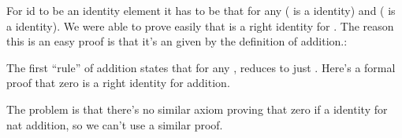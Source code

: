 \documentclass[letterpaper,10pt,english]{sphinxmanual}
\begin{document}
\sphinxAtStartPar
For id to be an identity element it has to be that for
any  ( is a  identity)
and  ( is a  identity). We were
able to prove easily that  is a right identity for
. The reason this is an easy proof is that it’s
an  given by the definition of addition.:

\begin{sphinxVerbatim}[commandchars=\\\{\}]
       
           
           
\end{sphinxVerbatim}

\sphinxAtStartPar
The first “rule” of addition states that for any ,
 reduces to just .  Here’s a formal proof
that zero is a right identity for addition.

\begin{sphinxVerbatim}[commandchars=\\\{\}]
           
 
  \PYG{o}{[}\PYG{o}{]}
\end{sphinxVerbatim}

\sphinxAtStartPar
The problem is that there’s no similar axiom proving
that zero if a  identity for nat addition, so
we can’t use a similar proof.

\begin{sphinxVerbatim}[commandchars=\\\{\}]
           
 
 \PYG{o}{[}\PYG{o}{]}   
\end{sphinxVerbatim}
\end{document}
